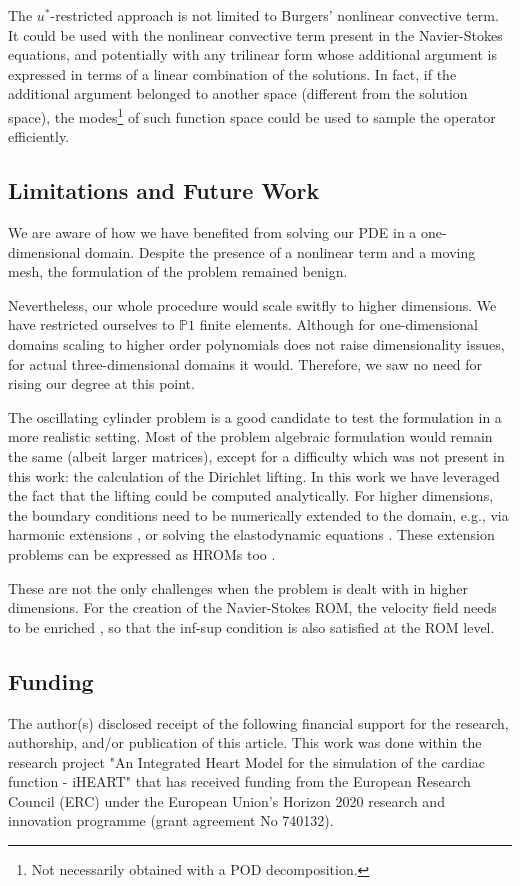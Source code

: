 \documentclass[thesis.tex]{subfiles}
\begin{document}
The \mbox{$u^{*}$-restricted} approach is not limited to Burgers' nonlinear convective term.
It could be used with the nonlinear convective term present in the Navier-Stokes equations,
and potentially with any trilinear form whose additional argument is expressed
in terms of a linear combination of the solutions.
In fact, if the additional argument belonged to another space (different from the solution space),
the modes\footnote{Not necessarily obtained with a POD decomposition.} of such function space could be used to sample the operator efficiently.

\subsection{Limitations and Future Work}
We are aware of how we have benefited from solving our PDE in a one-dimensional domain.
Despite the presence of a nonlinear term and a moving mesh,
the formulation of the problem remained benign. 

Nevertheless, our whole procedure would scale switfly to higher dimensions.
We have restricted ourselves to $\mathbb{P}1$ finite elements.
Although for one-dimensional domains scaling to higher order polynomials does not
raise dimensionality issues, for actual three-dimensional domains it would.
Therefore, we saw no need for rising our degree at this point.

The oscillating cylinder problem is a good candidate 
to test the formulation in a more realistic setting.
Most of the problem algebraic formulation would remain the same (albeit larger matrices),
except for a difficulty which was not present in this work: 
the calculation of the Dirichlet lifting. 
In this work we have leveraged the fact that the lifting could be computed analytically.
For higher dimensions, the boundary conditions need to be numerically extended to the domain, 
e.g., via harmonic extensions
\cite{formaggiaALE},
or solving the elastodynamic equations
\cite{1995_farhat_elasticEquations}.
These extension problems can be expressed as HROMs too \cite{Santo_Manzoni_2019}.

These are not the only challenges when the problem is dealt with in higher dimensions.
For the creation of the Navier-Stokes ROM, the velocity field needs to be enriched
\cite{supremizers},
so that the inf-sup condition is also satisfied at the ROM level.

\newpage
\subsection*{Funding}
The author(s) disclosed receipt of the following financial support for the research, 
authorship, and/or publication of this article.
This work was done
within the research project 
"An Integrated Heart Model for the simulation of the cardiac function - iHEART" 
that has received funding from the European Research Council (ERC) 
under the European Union’s Horizon 2020 research and innovation programme 
(grant agreement No 740132).
\end{document}
